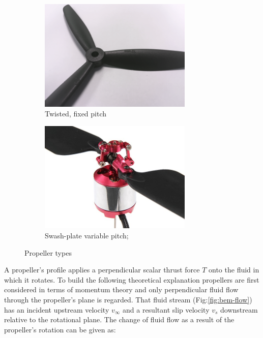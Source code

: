 \begin{figure}[htbp]
\vspace{-8pt}
\centering
\begin{subfigure}{0.49\textwidth}
\centering
\includegraphics[width=0.8\textwidth]{figs/fixed-pitch}
\vspace{-4pt}
\caption{Twisted, fixed pitch}
\label{fig:fixed-pitch}
\end{subfigure}
\begin{subfigure}{0.49\textwidth}
\centering
\includegraphics[width=0.8\textwidth]{figs/variable-pitch}
\vspace{-4pt}
\caption{Swash-plate variable pitch; \cite{variablepitch}}
\label{fig:variable-pitch}
\end{subfigure}
\vspace{-10pt}
\caption{Propeller types}
\label{fig:props}
\vspace{-18pt}
\end{figure}
\par
A propeller's profile applies a perpendicular scalar thrust force $T$ onto the fluid in which it rotates. To build the following theoretical explanation propellers are first considered in terms of momentum theory and only perpendicular fluid flow through the propeller's plane is regarded. That fluid stream (Fig:\ref{fig:bem-flow}) has an incident upstream velocity $v_\infty$ and a resultant slip velocity $v_s$ downstream relative to the rotational plane. The change of fluid flow as a result of the propeller's rotation can be given as:
